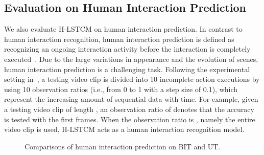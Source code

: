 \documentclass[9pt,journal,letterpaper,twocolumn]{IEEEtran}
\begin{document}
	\subsection{Evaluation on Human Interaction Prediction}
	We also evaluate H-LSTCM on human interaction prediction. In contrast to human interaction recognition, human interaction prediction is defined as recognizing an ongoing interaction activity before the interaction is completely executed~\cite{ke2016spatial,ryoo2011human}. Due to the large variations in appearance and the evolution of scenes, human interaction prediction is a challenging task. Following the experimental setting in~\cite{ke2016spatial,kong2014max}, a testing video clip is divided into 10 incomplete action executions by using 10 observation ratios (i.e., from 0 to 1 with a step size of 0.1), which represent the increasing amount of sequential data with time. For example, given a testing video clip of length , an observation ratio of  denotes that the accuracy is tested with the first  frames. When the observation ratio is , namely the entire video clip is used, H-LSTCM acts as a human interaction recognition model.
	
	
	
\begin{figure}[!t]
		
		\centering
		\vspace{-3mm}
		\caption{Comparisons of human interaction prediction on BIT and UT.}
		\label{fig_prediction}
		\vspace{-3mm}
	\end{figure}
	
\end{document}
